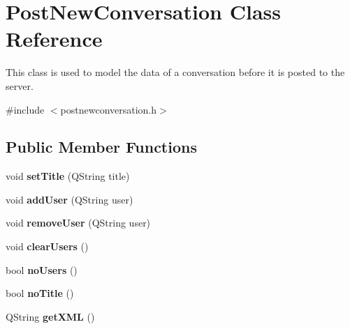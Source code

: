 \hypertarget{classPostNewConversation}{\section{Post\-New\-Conversation Class Reference}
\label{classPostNewConversation}
}


This class is used to model the data of a conversation before it is posted to the server.  




{\ttfamily \#include $<$postnewconversation.\-h$>$}

\subsection*{Public Member Functions}
\begin{DoxyCompactItemize}
\item 
\hypertarget{classPostNewConversation_aa459a1f1a2e29802fd1366f673720a73}{void {\bfseries set\-Title} (Q\-String title)}\label{classPostNewConversation_aa459a1f1a2e29802fd1366f673720a73}

\item 
\hypertarget{classPostNewConversation_ad5e46d3f9cf18d3b755d316b6c566391}{void {\bfseries add\-User} (Q\-String user)}\label{classPostNewConversation_ad5e46d3f9cf18d3b755d316b6c566391}

\item 
\hypertarget{classPostNewConversation_a45df7b17fbb333dea9afcb1707789652}{void {\bfseries remove\-User} (Q\-String user)}\label{classPostNewConversation_a45df7b17fbb333dea9afcb1707789652}

\item 
\hypertarget{classPostNewConversation_a72bb26b00365f6193f1bf29faa643f90}{void {\bfseries clear\-Users} ()}\label{classPostNewConversation_a72bb26b00365f6193f1bf29faa643f90}

\item 
\hypertarget{classPostNewConversation_a93092a7591d0abc8de09e82c948b0177}{bool {\bfseries no\-Users} ()}\label{classPostNewConversation_a93092a7591d0abc8de09e82c948b0177}

\item 
\hypertarget{classPostNewConversation_a821171e9118e29d3cd873ab0d13f3cba}{bool {\bfseries no\-Title} ()}\label{classPostNewConversation_a821171e9118e29d3cd873ab0d13f3cba}

\item 
\hypertarget{classPostNewConversation_a892dd3df54101c8ab6c27a60e1d2a6a5}{Q\-String {\bfseries get\-X\-M\-L} ()}\label{classPostNewConversation_a892dd3df54101c8ab6c27a60e1d2a6a5}

\end{DoxyCompactItemize}



